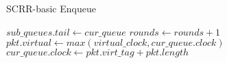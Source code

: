 \begin{algorithm}[b!]
\caption{SCRR-basic Enqueue}
\label{alg:scrr-basic-enq}
\begin{algorithmic}

\State $sub\_queues.tail \gets cur\_queue$
\State $rounds \gets rounds + 1$
\EndIf
\State $pkt.virtual \gets max(virtual\_clock, cur\_queue.clock)$
\State $cur\_queue.clock \gets pkt.virt\_tag + pkt.length$
\State
{}
\EndFunction
\end{algorithmic}
\end{algorithm}
